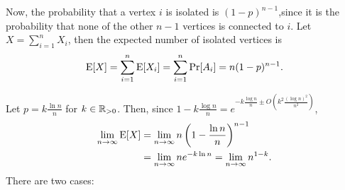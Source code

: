 Now, the probability that a vertex $i$ is isolated is $(1 - p)^{n - 1}$,since it is the probability that none of the other $n - 1$ vertices is connected to $i$. Let $X = \sum_{i = 1}^n X_i$, then the expected number of isolated vertices is
 \[\mathrm{E}[X] = \sum_{i = 1}^{n} \mathrm{E}[X_i] = \sum_{i = 1}^{n} \mathrm{Pr}[A_i] = n(1 - p)^{n - 1}.\]


Let $\displaystyle{p = k\frac{\ln n}{n}}$ for $k \in \mathbb{R}_{>0}$. Then, since $1 - k\frac{\log n}{n} = e^{-k\frac{\log n}{n} \pm O\left(k^2\frac{(\log n)^2}{n^2}\right)}$,
\begin{align*}
    \lim_{n \to \infty} \mathrm{E}[X] &= \lim_{n \to \infty} n\left(1 - \frac{\ln n}{n}\right)^{n - 1}\\
    &= \lim_{n \to \infty} ne^{-k\ln n} = \lim_{n \to \infty} n^{1 - k}.
\end{align*}
There are two cases: \par
